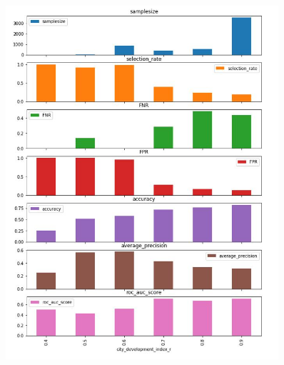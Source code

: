\begin{figure}
    \centering
\includegraphics[width=0.9\textwidth]{development.JPG}
    \label{fig: 2}
\end{figure}





